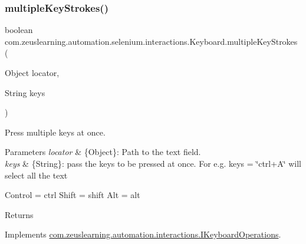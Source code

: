 \subsubsection{\texorpdfstring{multiple\+Key\+Strokes()}{multipleKeyStrokes()}\hspace{0.1cm}{\footnotesize\ttfamily [1/2]}}
{\footnotesize\ttfamily boolean com.\+zeuslearning.\+automation.\+selenium.\+interactions.\+Keyboard.\+multiple\+Key\+Strokes (\begin{DoxyParamCaption}\item[{Object}]{locator,  }\item[{String}]{keys }\end{DoxyParamCaption})\hspace{0.3cm}{\ttfamily [inline]}}

Press multiple keys at once.


\begin{DoxyParams}{Parameters}
{\em locator} & \{Object\}\+: Path to the text field. \\
\hline
{\em keys} & \{String\}\+: pass the keys to be pressed at once. For e.\+g. keys = \char`\"{}ctrl+\+A\char`\"{} will select all the text\\
\hline
\end{DoxyParams}
Control = ctrl Shift = shift Alt = alt \begin{DoxyReturn}{Returns}

\end{DoxyReturn}


Implements \hyperlink{interfacecom_1_1zeuslearning_1_1automation_1_1interactions_1_1IKeyboardOperations_a4e070904ad56761bd97d494542833274}{com.\+zeuslearning.\+automation.\+interactions.\+I\+Keyboard\+Operations}.

